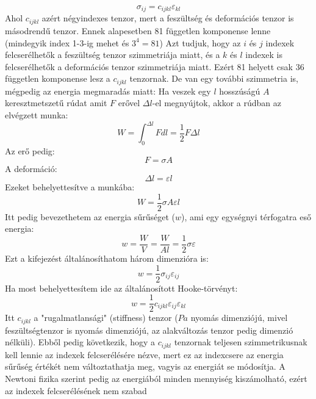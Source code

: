 \documentclass[a4paper,12pt]{article}
\begin{document}
\begin{equation}
    \sigma_{ij} = c_{ijkl} \varepsilon_{kl}
\end{equation}
Ahol $c_{ijkl}$ azért négyindexes tenzor, mert a feszültség és deformációs tenzor is másodrendű tenzor. Ennek alapesetben 81 független komponense lenne (mindegyik index 1-3-ig mehet és $3^4 = 81$) Azt tudjuk, hogy az $i$ és $j$ indexek felcserélhetők a feszültség tenzor szimmetriája miatt, és a $k$ és $l$ indexek is felcserélhetők
a deformációs tenzor szimmetriája miatt. Ezért 81 helyett csak 36 független komponense lesz a $c_{ijkl}$ tenzornak. De van egy további szimmetria is, mégpedig az energia megmaradás miatt:
\newline
Ha veszek egy $l$ hosszúságú $A$ keresztmetszetű rúdat amit $F$ erővel $\Delta l$-el megnyújtok, akkor a rúdban az elvégzett munka:
\begin{equation}
    W = \int_0^{\Delta l} F dl = \frac{1}{2} F \Delta l
\end{equation}
Az erő pedig:
\begin{equation}
    F = \sigma A
\end{equation}
A deformáció:
\begin{equation}
    \Delta l = \varepsilon l
\end{equation}
Ezeket behelyettesítve a munkába:
\begin{equation}
    W = \frac{1}{2} \sigma A \varepsilon l
\end{equation}
Itt pedig bevezethetem az energia sűrűséget ($w$), ami egy egységnyi térfogatra eső energia:
\begin{equation}
    w = \frac{W}{V} = \frac{W}{Al} = \frac{1}{2} \sigma \varepsilon
\end{equation}
Ezt a kifejezést általánosíthatom három dimenzióra is:
\begin{equation}
    w = \frac{1}{2} \sigma_{ij} \varepsilon_{ij}
\end{equation}
Ha most behelyettesítem ide az általánosított Hooke-törvényt:
\begin{equation}
    w = \frac{1}{2} c_{ijkl} \varepsilon_{ij} \varepsilon_{kl}
\end{equation}
Itt $c_{ijkl}$ a "rugalmatlansági" (stiffness) tenzor ($Pa$ nyomás dimenziójú, mivel feszültségtenzor is nyomás dimenziójú, az alakváltozás tenzor pedig dimenzió nélküli). Ebből pedig következik, hogy a $c_{ijkl}$ tenzornak teljesen szimmetrikusnak kell lennie az indexek felcserélésére nézve, mert ez az indexcsere az energia sűrűség
értékét nem változtathatja meg, vagyis az energiát se módosítja. A Newtoni fizika szerint pedig az energiából minden mennyiség kiszámolható, ezért az indexek felcserélésének nem szabad
\end{document}
